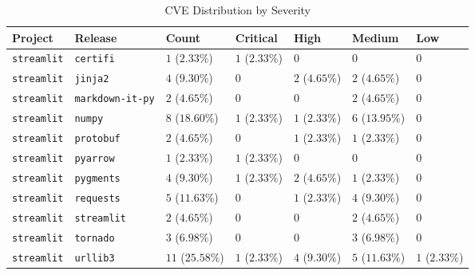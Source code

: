 \begin{table}
\caption{CVE Distribution by Severity}
\label{tab:cve-distribution}
\begin{tabular}{lllllll}
\toprule
Project & Release & Count & Critical & High & Medium & Low \\
\midrule
\texttt{streamlit} & \texttt{certifi} & $1$ ($2.33\%$) & $1$ ($2.33\%$) & $0$ & $0$ & $0$ \\
\texttt{streamlit} & \texttt{jinja2} & $4$ ($9.30\%$) & $0$ & $2$ ($4.65\%$) & $2$ ($4.65\%$) & $0$ \\
\texttt{streamlit} & \texttt{markdown-it-py} & $2$ ($4.65\%$) & $0$ & $0$ & $2$ ($4.65\%$) & $0$ \\
\texttt{streamlit} & \texttt{numpy} & $8$ ($18.60\%$) & $1$ ($2.33\%$) & $1$ ($2.33\%$) & $6$ ($13.95\%$) & $0$ \\
\texttt{streamlit} & \texttt{protobuf} & $2$ ($4.65\%$) & $0$ & $1$ ($2.33\%$) & $1$ ($2.33\%$) & $0$ \\
\texttt{streamlit} & \texttt{pyarrow} & $1$ ($2.33\%$) & $1$ ($2.33\%$) & $0$ & $0$ & $0$ \\
\texttt{streamlit} & \texttt{pygments} & $4$ ($9.30\%$) & $1$ ($2.33\%$) & $2$ ($4.65\%$) & $1$ ($2.33\%$) & $0$ \\
\texttt{streamlit} & \texttt{requests} & $5$ ($11.63\%$) & $0$ & $1$ ($2.33\%$) & $4$ ($9.30\%$) & $0$ \\
\texttt{streamlit} & \texttt{streamlit} & $2$ ($4.65\%$) & $0$ & $0$ & $2$ ($4.65\%$) & $0$ \\
\texttt{streamlit} & \texttt{tornado} & $3$ ($6.98\%$) & $0$ & $0$ & $3$ ($6.98\%$) & $0$ \\
\texttt{streamlit} & \texttt{urllib3} & $11$ ($25.58\%$) & $1$ ($2.33\%$) & $4$ ($9.30\%$) & $5$ ($11.63\%$) & $1$ ($2.33\%$) \\
\bottomrule
\end{tabular}
\end{table}
